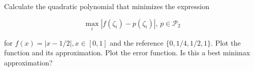 \begin{problem}
  Calculate the quadratic polynomial that minimizes the expression

  \begin{equation}
    \max_i |f (\zeta_i) − p(\zeta_i)|, \, p \in \mathcal{P}_2 
  \end{equation}

  for $f (x) = |x − 1/2|, x \in [0, 1]$ and the reference
  $\{0, 1/4, 1/2, 1\}$. Plot the function and its approximation. Plot
  the error function. Is this a best minimax approximation?
\end{problem}


\begin{solution}

\end{solution}

